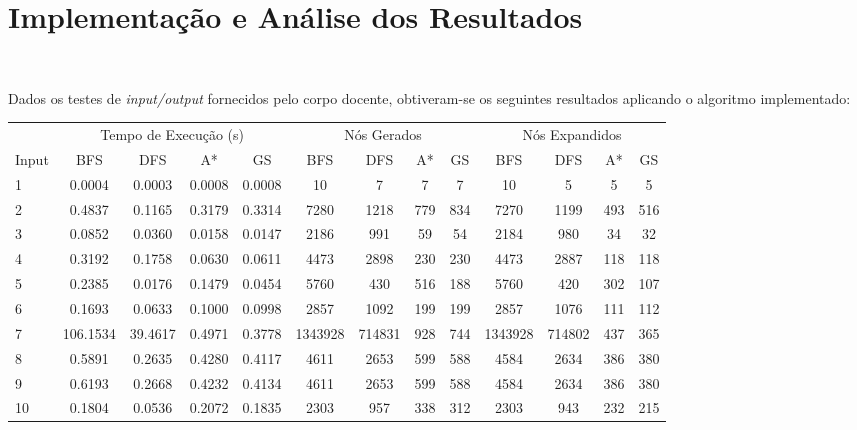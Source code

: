 \documentclass[12pt]{exam}
\begin{document}
    \section{Implementação e Análise dos Resultados}~

        \indent Dados os testes de \textit{input/output} fornecidos pelo corpo docente, obtiveram-se os seguintes resultados aplicando o algoritmo implementado:\\

        \begin{adjustbox}{width={\textwidth}, totalheight={\textheight}, keepaspectratio}
        \begin{tabular}{l cccc cccc cccc}
        \toprule
         & \multicolumn{4}{c}{Tempo de Execução (s)} & \multicolumn{4}{c}{Nós Gerados} & \multicolumn{4}{c}{Nós Expandidos}\\
        \cmidrule(lr){2-5} \cmidrule(lr){6-9} \cmidrule(lr){10-13}
        Input           & BFS  & DFS  & A* & GS       & BFS  & DFS  & A* & GS        & BFS  & DFS  & A* & GS \\
        \midrule
        1               & 0.0004 & 0.0003  & 0.0008    & 0.0008            & 10    & 7 & 7    & 7       & 10   & 5   & 5      &5  \\
        2               & 0.4837 & 0.1165  & 0.3179    & 0.3314            & 7280  & 1218 & 779  & 834       & 7270   & 1199   & 493    &516  \\
        3               & 0.0852 & 0.0360  & 0.0158    & 0.0147            & 2186  & 991 & 59   & 54       & 2184   & 980   & 34     &32  \\
        4               & 0.3192 & 0.1758  & 0.0630    & 0.0611            & 4473  & 2898 & 230  & 230       & 4473   & 2887   & 118    &118  \\
        5               & 0.2385 & 0.0176  & 0.1479    & 0.0454            & 5760  & 430 & 516  & 188       & 5760   & 420   & 302    &107  \\
        6               & 0.1693 & 0.0633  & 0.1000    & 0.0998            & 2857  & 1092 & 199  & 199       & 2857   & 1076   & 111    &112  \\
        7             & 106.1534 & 39.4617  & 0.4971    & 0.3778         & 1343928  & 714831 & 928  & 744       & 1343928   & 714802   & 437    &365  \\
        8               & 0.5891 & 0.2635  & 0.4280    & 0.4117            & 4611  & 2653 & 599  & 588       & 4584   & 2634   & 386    &380  \\
        9               & 0.6193 & 0.2668  & 0.4232    & 0.4134            & 4611  & 2653 & 599  & 588       & 4584   & 2634   & 386    &380  \\
        10              & 0.1804 & 0.0536  & 0.2072    & 0.1835            & 2303  & 957 & 338  & 312       & 2303   & 943   & 232    &215  \\
        \bottomrule
        \end{tabular}
        \end{adjustbox} \\
\end{document}
